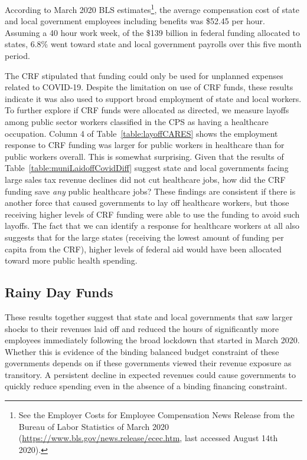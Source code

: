 According to March 2020 BLS estimates\footnote{See the  Employer Costs for Employee Compensation News Release from the Bureau of Labor Statistics of March 2020 (\url{https://www.bls.gov/news.release/ecec.htm}, last accessed August 14th 2020).}, the average compensation cost of state and local government employees including benefits was \$52.45 per hour. Assuming a 40 hour work week, of the \$139 billion in federal funding allocated to states, 6.8\% went toward state and local government payrolls over this five month period.

The CRF stipulated that funding could only be used for unplanned expenses related to COVID-19. Despite the limitation on use of CRF funds, these results indicate it was also used to support broad employment of state and local workers. To further explore if CRF funds were allocated as directed, we measure layoffs among public sector workers classified in the CPS as having a healthcare occupation.  Column 4 of Table~\ref{table:layoffCARES} shows the employment response to CRF funding was larger for public workers in healthcare than for public workers overall. This is somewhat surprising. Given that the results of Table~\ref{table:muniLaidoffCovidDiff} suggest state and local governments facing large sales tax revenue declines did not cut healthcare jobs, how did the CRF funding save \emph{any} public healthcare jobs? These findings are consistent if there is another force that caused governments to lay off healthcare workers, but those receiving higher levels of CRF funding were able to use the funding to avoid such layoffs. 
The fact that we can identify a response for healthcare workers at all also suggests that for the large states (receiving the lowest amount of funding per capita from the CRF), higher levels of federal aid would have been allocated toward more public health spending. 

\subsection{Rainy Day Funds}
\label{subsec:RainyDayFunds}

These results together suggest that state and local governments that saw larger shocks to their revenues laid off and reduced the hours of significantly more employees immediately following the broad lockdown that started in March 2020. Whether this is evidence of the binding balanced budget constraint of these governments depends on if these governments viewed their revenue exposure as transitory. A persistent decline in expected revenues could cause governments to quickly reduce spending even in the absence of a binding financing constraint. 

